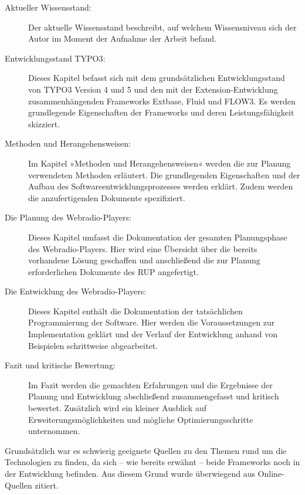 \begin{description}

	\item[Aktueller Wissensstand:] Der aktuelle Wissensstand beschreibt, auf welchem Wissensniveau sich der Autor im Moment der Aufnahme der Arbeit befand.
	
	\item[Entwicklungsstand TYPO3:] Dieses Kapitel befasst sich mit dem grunds\"atzlichen Entwicklungsstand von TYPO3 Version 4 und 5 und den mit der Extension-Entwicklung zusammenh\"angenden Frameworks Extbase, Fluid und FLOW3. Es werden grundlegende Eigenschaften der Frameworks und deren Leistungsf\"ahigkeit skizziert.
	
	\item[Methoden und Herangehensweisen:] Im Kapitel »Methoden und Herangehensweisen« werden die zur Planung verwendeten Methoden erl\"autert. Die grundlegenden Eigenschaften und der Aufbau des Softwareentwicklungsprozesses  werden erkl\"art. Zudem werden die anzufertigenden Dokumente spezifiziert.
	
	\item[Die Planung des Webradio-Players:] Dieses Kapitel umfasst die Dokumentation der gesamten Planungsphase des Webradio-Players. Hier wird eine \"Ubersicht \"uber die bereits vorhandene L\"osung geschaffen und anschlie{\ss}end die zur Planung erforderlichen Dokumente des RUP angefertigt.
	
	\item[Die Entwicklung des Webradio-Players:] Dieses Kapitel enth\"alt die Dokumentation der tats\"achlichen Programmierung der Software. Hier werden die Voraussetzungen zur Implementation gekl\"art und der Verlauf der Entwicklung anhand von Beispielen schrittweise abgearbeitet.
	
	\item[Fazit und kritische Bewertung:] Im Fazit werden die gemachten Erfahrungen und die Ergebnisse der Planung und Entwicklung abschlie{\ss}end zusammengefasst und kritisch bewertet. Zus\"atzlich wird ein kleiner Ausblick auf Erweiterungsm\"oglichkeiten und m\"ogliche Optimierungsschritte unternommen.

\end{description}



Grunds\"atzlich war es schwierig geeignete Quellen zu den Themen rund um die Technologien zu finden, da sich -- wie bereits erw\"ahnt -- beide Frameworks noch in der Entwicklung befinden. Aus diesem Grund wurde \"uberwiegend aus Online-Quellen zitiert.

